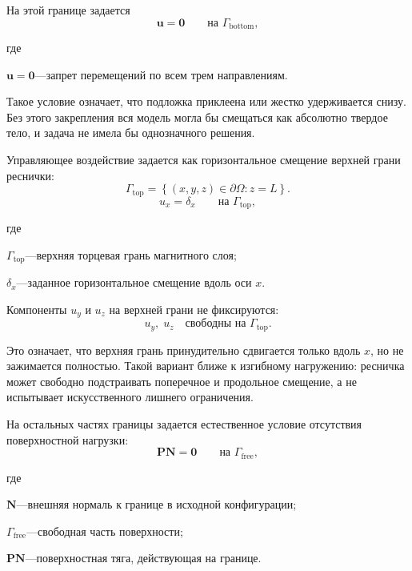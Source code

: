 \documentclass[14pt,a4paper]{extarticle}
\newif\ifwherefirst
\newcommand{\whereitem}[2]{%
    \ifwherefirst
        \wherefirstfalse
        #1\hspace{0.25em}---\hspace{0.25em}#2\par
    \else
        \noindent\hspace*{\parindent}\hphantom{где\enspace}#1\hspace{0.25em}---\hspace{0.25em}#2\par
    \fi
}
\newenvironment{whereblock}{%
    \vspace*{-1.55\baselineskip}%
    \begingroup
    \singlespacing
    \wherefirsttrue
    \par\indent где\enspace\ignorespaces
}{%
    \par\endgroup
    \par\vspace{\baselineskip}
}
\begin{document}
На этой границе задается
\begin{equation}
    \mathbf{u}=\mathbf{0}
    \qquad
    \text{на }\Gamma_{\mathrm{bottom}},
\end{equation}
\begin{whereblock}
\whereitem{\(\mathbf{u}=\mathbf{0}\)}{запрет перемещений по всем трем направлениям.}
\end{whereblock}

Такое условие означает, что подложка приклеена или жестко удерживается снизу. Без этого закрепления вся модель могла бы смещаться как абсолютно твердое тело, и задача не имела бы однозначного решения.

Управляющее воздействие задается как горизонтальное смещение верхней грани реснички:
\begin{equation}
    \Gamma_{\mathrm{top}}
    =
    \left\{
    (x,y,z)\in\partial\Omega:
    z=L
    \right\}.
\end{equation}
\begin{equation}
    u_x=\delta_x
    \qquad
    \text{на }\Gamma_{\mathrm{top}},
\end{equation}
\begin{whereblock}
\whereitem{\(\Gamma_{\mathrm{top}}\)}{верхняя торцевая грань магнитного слоя;}
\whereitem{\(\delta_x\)}{заданное горизонтальное смещение вдоль оси \(x\).}
\end{whereblock}

Компоненты \(u_y\) и \(u_z\) на верхней грани не фиксируются:
\begin{equation}
    u_y,\;u_z
    \quad
    \text{свободны на }\Gamma_{\mathrm{top}}.
\end{equation}

Это означает, что верхняя грань принудительно сдвигается только вдоль \(x\), но не зажимается полностью. Такой вариант ближе к изгибному нагружению: ресничка может свободно подстраивать поперечное и продольное смещение, а не испытывает искусственного лишнего ограничения.

На остальных частях границы задается естественное условие отсутствия поверхностной нагрузки:
\begin{equation}
    \mathbf{P}\mathbf{N}=\mathbf{0}
    \qquad
    \text{на }\Gamma_{\mathrm{free}},
\end{equation}
\begin{whereblock}
\whereitem{\(\mathbf{N}\)}{внешняя нормаль к границе в исходной конфигурации;}
\whereitem{\(\Gamma_{\mathrm{free}}\)}{свободная часть поверхности;}
\whereitem{\(\mathbf{P}\mathbf{N}\)}{поверхностная тяга, действующая на границе.}
\end{whereblock}
\end{document}
